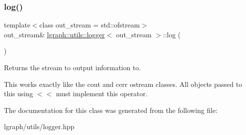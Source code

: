\subsubsection{\texorpdfstring{log()}{log()}}
{\footnotesize\ttfamily template$<$class out\+\_\+stream = std\+::ofstream$>$ \\
out\+\_\+stream\& \hyperlink{classlgraph_1_1utils_1_1logger}{lgraph\+::utils\+::logger}$<$ out\+\_\+stream $>$\+::log (\begin{DoxyParamCaption}{ }\end{DoxyParamCaption})\hspace{0.3cm}{\ttfamily [inline]}}



Returns the stream to output information to. 

This works exactly like the \textquotesingle{}cout\textquotesingle{} and \textquotesingle{}cerr\textquotesingle{} ostream classes. All objects passed to this using \textquotesingle{}$<$$<$\textquotesingle{} must implement this operator. 

The documentation for this class was generated from the following file\+:\begin{DoxyCompactItemize}
\item 
lgraph/utils/logger.\+hpp\end{DoxyCompactItemize}
